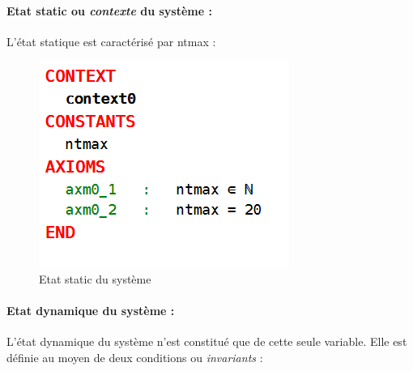 \paragraph{Etat static ou \textit{contexte} du système :}
L'état statique est caractérisé par ntmax :
\begin{figure}[H]
	\begin{center}	
		\includegraphics[scale=0.8]{images/ctx0}
		\caption{Etat static du système}
		\label{ctx0}
	\end{center}
\end{figure}

\paragraph{Etat dynamique du système :}
 L'état dynamique du système n'est constitué que de cette seule variable. Elle est définie au moyen de deux conditions ou \textit{invariants} :
%   
%   


